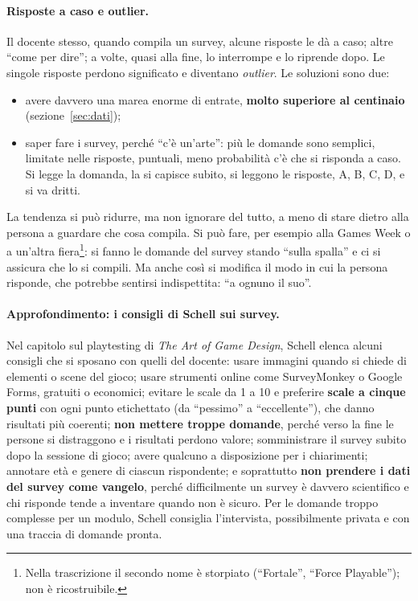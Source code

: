 \paragraph{Risposte a caso e outlier.} Il docente stesso, quando compila un
survey, alcune risposte le dà a caso; altre ``come per dire''; a volte,
quasi alla fine, lo interrompe e lo riprende dopo. Le singole risposte
perdono significato e diventano \emph{outlier}. Le soluzioni sono due:
\begin{itemize}
  \item avere davvero una marea enorme di entrate, \textbf{molto superiore al
        centinaio} (sezione~\ref{sec:dati});
  \item saper fare i survey, perché ``c'è un'arte'': più le domande sono
        semplici, limitate nelle risposte, puntuali, meno probabilità c'è
        che si risponda a caso. Si legge la domanda, la si capisce subito, si
        leggono le risposte, A, B, C, D, e si va dritti.
\end{itemize}
La tendenza si può ridurre, ma non ignorare del tutto, a meno di stare
dietro alla persona a guardare che cosa compila. Si può fare, per esempio
alla Games Week o a un'altra fiera\footnote{Nella trascrizione il secondo nome
è storpiato (``Fortale'', ``Force Playable''); non è ricostruibile.}: si fanno
le domande del survey stando ``sulla spalla'' e ci si assicura che lo si
compili. Ma anche così si modifica il modo in cui la persona risponde, che
potrebbe sentirsi indispettita: ``a ognuno il suo''.

\paragraph{Approfondimento: i consigli di Schell sui survey.} Nel capitolo sul
playtesting di \emph{The Art of Game Design}, Schell elenca alcuni consigli
che si sposano con quelli del docente: usare immagini quando si chiede di
elementi o scene del gioco; usare strumenti online come SurveyMonkey o Google
Forms, gratuiti o economici; evitare le scale da 1 a 10 e preferire
\textbf{scale a cinque punti} con ogni punto etichettato (da ``pessimo'' a
``eccellente''), che danno risultati più coerenti; \textbf{non mettere troppe
domande}, perché verso la fine le persone si distraggono e i risultati perdono
valore; somministrare il survey subito dopo la sessione di gioco; avere
qualcuno a disposizione per i chiarimenti; annotare età e genere di ciascun
rispondente; e soprattutto \textbf{non prendere i dati del survey come
vangelo}, perché difficilmente un survey è davvero scientifico e chi risponde
tende a inventare quando non è sicuro. Per le domande troppo complesse per un
modulo, Schell consiglia l'intervista, possibilmente privata e con una
traccia di domande pronta.

